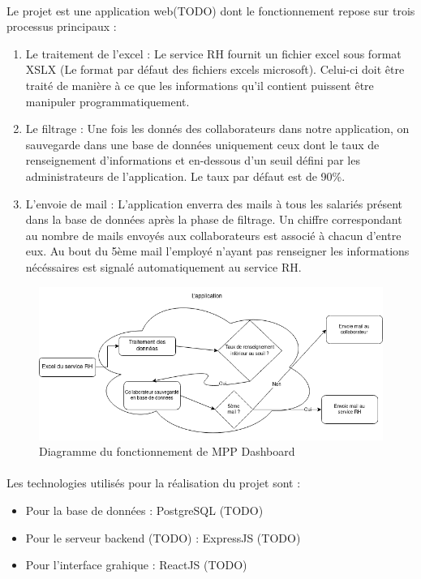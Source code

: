 \documentclass[12pt]{article}
\begin{document}
\begin {sloppypar}
\paragraph {} 
Le projet est une application web(TODO) dont le fonctionnement repose sur trois processus
principaux : 
\begin {enumerate}
  \item 
    Le traitement de l'excel : Le service RH fournit un fichier excel sous format XSLX 
    (Le format par défaut des fichiers excels microsoft). Celui-ci doit être traité de 
    manière à ce que les informations qu'il contient puissent être manipuler 
    programmatiquement.
  \item 
    Le filtrage : Une fois les donnés des collaborateurs dans notre application, on
    sauvegarde dans une base de données uniquement ceux dont le taux de renseignement 
    d'informations et en-dessous d'un seuil défini par les administrateurs de 
    l'application. Le taux par défaut est de 90\%. 
  \item 
    L'envoie de mail : L'application enverra des mails à tous les salariés présent 
    dans la base de données après la phase de filtrage. Un chiffre correspondant au nombre
    de mails envoyés aux collaborateurs est associé à chacun d'entre eux. Au bout du 
    5ème mail l'employé n'ayant pas renseigner les informations nécéssaires est signalé 
    automatiquement au service RH.
\end{enumerate}
\newpage
\begin{figure}
  \includegraphics[width=\textwidth] {mpp-diagram.png}
  \caption {Diagramme du fonctionnement de MPP Dashboard}
\end{figure}
\paragraph {}
Les technologies utilisés pour la réalisation du projet sont : 
\begin {itemize}
\item   
  Pour la base de données : PostgreSQL (TODO)
\item 
  Pour le serveur backend (TODO) : ExpressJS (TODO)
\item 
  Pour l'interface grahique : ReactJS (TODO)
\end {itemize}


\end{sloppypar}
\end{document}
